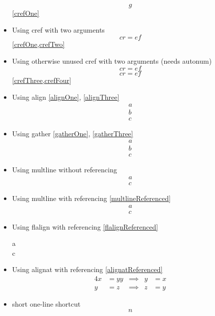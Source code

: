 \documentclass{article}
\begin{document}
\begin{itemize}
\begin{equation}
				g
			\end{equation}
			\cref{crefOne}
		\item Using cref with two arguments
			\begin{equation}\label{crefTwo}
				cr = ef
			\end{equation}
			\cref{crefOne,crefTwo}
		\item Using otherwise unused cref with two arguments (needs autonum)
			\[\label{crefThree}
				cr = ef
			\]
			\[\label{crefFour}
				cr = ef
			\]
			\cref{crefThree,crefFour}
		\item Using align \ref{alignOne}, \ref{alignThree}
			\begin{align}
				a\label{alignOne}\\
				b\label{alignTwo}\\
				c\label{alignThree}
			\end{align}
		\item Using gather \ref{gatherOne}, \ref{gatherThree}
			\begin{gather}
				a\label{gatherOne}\\
				b\label{gatherTwo}\\
				c\label{gatherThree}
			\end{gather}
		\item Using multline without referencing
			\begin{multline}
				a\\
				c\label{multlineUnreferenced}
			\end{multline}
		\item Using multline with referencing \ref{multlineReferenced}
			\begin{multline}
				a\\
				c\label{multlineReferenced}
			\end{multline}
		\item Using flalign with referencing \ref{flalignReferenced}
			\begin{flalign}
				a\\
				c\label{flalignReferenced}
			\end{flalign}
		\item Using alignat with referencing \ref{alignatReferenced}
			\begin{alignat}{4}
				x &= yy & \implies & y &= x \label{alignatUnreferenced}\\
				y &= z & \implies & z &= y \label{alignatReferenced}
			\end{alignat}
		\item short one-line shortcut \[n\]

\end{itemize}
\end{document}
